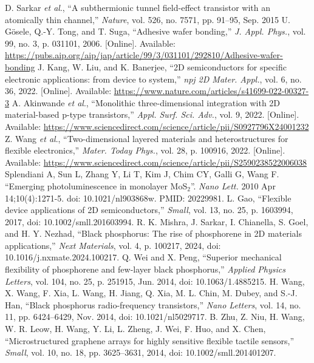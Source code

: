 \documentclass[conference]{IEEEtran}
\begin{document}
\begin{thebibliography}{00}
 D. Sarkar \textit{et al}., ``A subthermionic tunnel field-effect transistor with an atomically thin channel,'' \textit{Nature}, vol. 526, no. 7571, pp. 91–95, Sep. 2015
 U. G\"osele, Q.-Y. Tong, and T. Suga, ``Adhesive wafer bonding,'' \textit{J. Appl. Phys.}, vol. 99, no. 3, p. 031101, 2006. [Online]. Available: \href{https://pubs.aip.org/aip/jap/article/99/3/031101/292810/Adhesive-wafer-bonding}{https://pubs.aip.org/aip/jap/article/99/3/031101/292810/Adhesive-wafer-bonding}
 J. Kang, W. Liu, and K. Banerjee, ``2D semiconductors for specific electronic applications: from device to system,'' \textit{npj 2D Mater. Appl.}, vol. 6, no. 36, 2022. [Online]. Available: \href{https://www.nature.com/articles/s41699-022-00327-3}{https://www.nature.com/articles/s41699-022-00327-3}
 A. Akinwande \textit{et al}., ``Monolithic three-dimensional integration with 2D material-based p-type transistors,'' \textit{Appl. Surf. Sci. Adv.}, vol. 9, 2022. [Online]. Available: \href{https://www.sciencedirect.com/science/article/pii/S0927796X24001232}{https://www.sciencedirect.com/science/article/pii/S0927796X24001232}
 Z. Wang \textit{et al}., ``Two-dimensional layered materials and heterostructures for flexible electronics,'' \textit{Mater. Today Phys.}, vol. 28, p. 100916, 2022. [Online]. Available: \href{https://www.sciencedirect.com/science/article/pii/S2590238522006038}{https://www.sciencedirect.com/science/article/pii/S2590238522006038}
 Splendiani A, Sun L, Zhang Y, Li T, Kim J, Chim CY, Galli G, Wang F. ``Emerging photoluminescence in monolayer MoS$_2$''. \textit{Nano Lett.} 2010 Apr 14;10(4):1271-5. doi: 10.1021/nl903868w. PMID: 20229981.
 L. Gao, ``Flexible device applications of 2D semiconductors,'' \textit{Small}, vol. 13, no. 25, p. 1603994, 2017, doi: 10.1002/smll.201603994.
 R. K. Mishra, J. Sarkar, I. Chianella, S. Goel, and H. Y. Nezhad, ``Black phosphorus: The rise of phosphorene in 2D materials applications,'' \textit{Next Materials}, vol. 4, p. 100217, 2024, doi: 10.1016/j.nxmate.2024.100217.
 Q. Wei and X. Peng, ``Superior mechanical flexibility of phosphorene and few-layer black phosphorus,'' \textit{Applied Physics Letters}, vol. 104, no. 25, p. 251915, Jun. 2014, doi: 10.1063/1.4885215.
 H. Wang, X. Wang, F. Xia, L. Wang, H. Jiang, Q. Xia, M. L. Chin, M. Dubey, and S.-J. Han, ``Black phosphorus radio-frequency transistors,'' \textit{Nano Letters}, vol. 14, no. 11, pp. 6424–6429, Nov. 2014, doi: 10.1021/nl5029717.
 B. Zhu, Z. Niu, H. Wang, W. R. Leow, H. Wang, Y. Li, L. Zheng, J. Wei, F. Huo, and X. Chen, ``Microstructured graphene arrays for highly sensitive flexible tactile sensors,'' \textit{Small}, vol. 10, no. 18, pp. 3625–3631, 2014, doi: 10.1002/smll.201401207.

\end{thebibliography}
\end{document}
